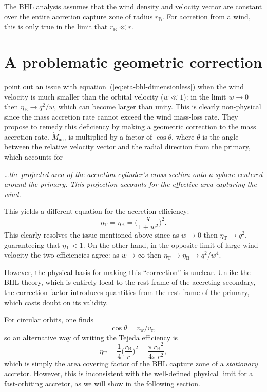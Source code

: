 \documentclass[useAMS, usenatbib, a4paper]{mnras}
\newcommand\wind{\ensuremath{_{\mathrm{w}}}}
\newcommand\rel{\ensuremath{_{\mathrm{r}}}}
\newcommand\bhl{\ensuremath{_{\mathrm{\scriptscriptstyle B}}}}
\newcommand\Tej{\ensuremath{_{\mathrm{\scriptscriptstyle T}}}}
\newcommand\acc{\ensuremath{_{\mathrm{acc}}}}
\newcommand\mdacc{\ensuremath{\dot M\acc}}
\begin{document}
The BHL analysis assumes that the wind density and velocity vector are constant
over the entire accretion capture zone of radius \(r\bhl\).
For accretion from a wind, this is only true in the limit that
\(r\bhl \ll r\). 

\section{A problematic geometric correction}
\label{sec:Tejeda-geometry}

\cite{Tejeda:2025a} point out an issue with equation~(\ref{eq:eta-bhl-dimensionless}) when the wind velocity is much smaller than the orbital velocity (\(w \ll 1\)): in the limit \(w \to 0\) then \(\eta\bhl \to q^2 / w\), which can become larger than unity.
This is clearly non-physical since the mass accretion rate cannot exceed the wind mass-loss rate.
They propose to remedy this deficiency by making a geometric correction
to the mass accretion rate.
\(\mdacc\) is multiplied by a factor of \(\cos\theta\),
where \(\theta\) is the angle between the relative velocity vector
and the radial direction from the primary,
which accounts for
\begin{center}
  \begin{minipage}{0.8\linewidth}\small\itshape
    \dots the projected area of the accretion cylinder's
    cross section onto a sphere centered around the primary. This
    projection accounts for the effective area capturing the wind.
  \end{minipage}
\end{center}
This yields a different equation for the accretion efficiency:
\begin{equation}
  \label{eq:eta-tejeda-dimensionless}
  \eta\Tej = \eta\bhl = \biggl( \frac{q}{1 + w^2} \biggr)^2 .
\end{equation}
This clearly resolves the issue mentioned above since as
\(w \to 0\) then \(\eta\Tej \to q^2 \), guaranteeing that \(\eta\Tej < 1  \).
On the other hand, in the opposite limit of large wind velocity
the two efficiencies agree: as \(w \to \infty\) then \(\eta\Tej \to \eta\bhl \to q^2 / w^4\).

However, the physical basis for making this ``correction'' is unclear.
Unlike the BHL theory, which is entirely local
to the rest frame of the accreting secondary,
the correction factor introduces quantities from the rest frame of the primary,
which casts doubt on its validity.

For circular orbits, one finds
\begin{equation}
  \label{eq:cos-theta}
  \cos\theta = v\wind / v\rel ,
\end{equation}
so an alternative way of writing the Tejeda efficiency is
\begin{equation}
  \label{eq:eta-tejeda}
  \eta\Tej = \frac{1}{4}
  \biggl( \frac{r\bhl}{r}\biggr)^2
  =  \frac{\pi \, r\bhl^2}{4 \pi \, r^2} ,
\end{equation}
which is simply the area covering factor of the BHL capture zone
of a \emph{stationary} accretor.
However, this is inconsistent with the well-defined physical limit
for a fast-orbiting accretor, as we will show in the following section.
\end{document}
